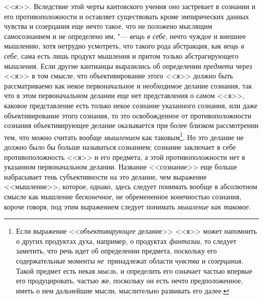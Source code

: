 <<{\em я}>>. Вследствие этой черты кантовского учения оно
застревает в сознании и его противоположности и оставляет существовать
кроме эмпирических данных чувства и созерцания еще нечто такое, что не
положено мыслящим самосознанием и не определено им, "---
{\em вещь в себе}, нечто чуждое и внешнее мышлению,
хотя нетрудно усмотреть, что такого рода абстракция, как
{\em вещь в себе}, сама есть лишь продукт мышления и
притом только абстрагирующего мышления. Если другие
кантианцы
выразились об определении {\em предмета} через <<я>> в
том смысле, что объективирование этого <<я>> должно быть рассматриваемо как
некое первоначальное и необходимое делание сознания, так что в этом
первоначальном делании еще нет представления о самом <<я>>, каковое
представление есть только некое сознание указанного сознания, или даже
объективирование этого сознания, то это освобожденное от противоположности
сознания объективирующее делание оказывается при более близком рассмотрении
тем, что можно считать вообще {\em мышлением} как
таковым\footnote{Если выражение <<{\em объективирующее}
делание>> <<я>> может напомнить о других продуктах духа, например, о продуктах
{\em фантазии}, то следует заметить, что речь идет об
определении предмета, поскольку его содержательные моменты
{\em не}~принадлежат области {\em чувства} и
{\em созерцания}. Такой предмет есть некая
{\em мысль}, и определить его означает частью впервые его
продуцировать, частью же, поскольку он есть нечто предположенное, иметь о
нем дальнейшие мысли, мыслительно развивать его далее.}. Но это делание не
должно было бы больше называться сознанием; сознание заключает в себе
противоположность <<я>> и его предмета, а этой противоположности нет в
указанном первоначальном делании. Название <<сознание>> еще больше
набрасывает тень субъективности на это делание, чем выражение <<мышление>>,
которое, однако, здесь следует понимать вообще в абсолютном смысле как
мышление {\em бесконечное}, не обремененное конечностью
сознания, короче говоря, под этим выражением следует понимать
{\em мышление как таковое}.

